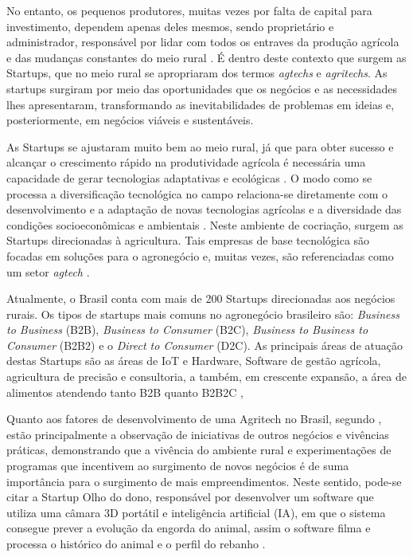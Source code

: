 No entanto, os pequenos produtores, muitas vezes por falta de capital para investimento, dependem apenas deles mesmos, sendo proprietário e administrador, responsável por lidar com todos os entraves da produção agrícola e das mudanças constantes do meio rural \cite{soares_relacao_2017}. É dentro deste contexto que surgem as Startups, que no meio rural se apropriaram dos termos \textit{agtechs} e \textit{agritechs}. As startups surgiram por meio das oportunidades que os negócios e as necessidades lhes apresentaram, transformando as inevitabilidades de problemas em ideias e, posteriormente, em negócios viáveis e sustentáveis. 

As Startups se ajustaram muito bem ao meio rural, já que para obter sucesso e alcançar o crescimento rápido na produtividade agrícola é necessária uma capacidade de gerar tecnologias adaptativas e ecológicas \cite{contini_hayami_2019}. O modo como se processa a diversificação tecnológica no campo relaciona-se diretamente com o desenvolvimento e a adaptação de novas tecnologias agrícolas e a diversidade das condições socioeconômicas e ambientais \cite{fen-azmeyer_o_2019}. Neste ambiente de cocriação, surgem as Startups direcionadas à agricultura. Tais empresas de base tecnológica são focadas em soluções para o agronegócio e, muitas vezes, são referenciadas como um setor \textit{agtech} \cite{blanco_agtechs_2020}.


Atualmente, o Brasil conta com mais de 200 Startups direcionadas aos negócios rurais.  Os tipos de startups mais comuns no agronegócio brasileiro são: \textit{Business to Business} (B2B), \textit{Business to Consumer} (B2C), \textit{Business to Business to Consumer} (B2B2) e o \textit{Direct to Consumer} (D2C). As principais áreas de atuação destas Startups são as áreas de IoT e Hardware, Software de gestão agrícola, agricultura de precisão e consultoria, a também, em crescente expansão, a área de alimentos atendendo tanto B2B quanto B2B2C \cite{abstartups_startupbase_2019}, 

Quanto aos fatores de desenvolvimento de uma Agritech no Brasil, segundo \cite{mondin_2_2018}, estão principalmente a observação de iniciativas de outros negócios e vivências práticas, demonstrando que a vivência do ambiente rural e experimentações de programas que incentivem ao surgimento de novos negócios é de suma importância para o surgimento de mais empreendimentos. Neste sentido, pode-se citar a Startup Olho do dono, responsável por desenvolver um software que utiliza uma câmara 3D portátil e inteligência artificial (IA), em que o sistema consegue prever a evolução da engorda do animal, assim o software filma e processa o histórico do animal e o perfil do rebanho \cite{coutinho_olho_2019}.




